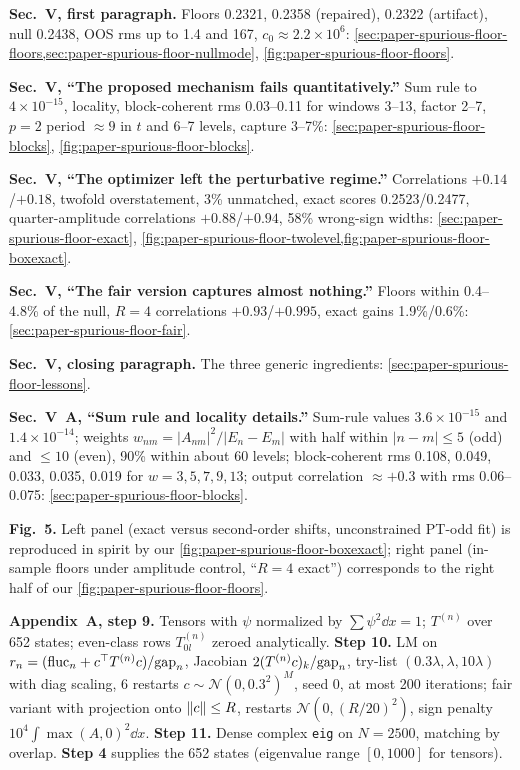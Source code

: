 \textbf{Sec.~V, first paragraph.} Floors 0.2321, 0.2358 (repaired), 0.2322 (artifact), null 0.2438, OOS rms up to 1.4 and 167, $c_0\approx2.2\times10^6$: \cref{sec:paper-spurious-floor-floors,sec:paper-spurious-floor-nullmode}, \cref{fig:paper-spurious-floor-floors}.

\textbf{Sec.~V, ``The proposed mechanism fails quantitatively.''} Sum rule to $4\times10^{-15}$, locality, block-coherent rms 0.03--0.11 for windows 3--13, factor 2--7, $p=2$ period $\approx9$ in $t$ and 6--7 levels, capture 3--7\%: \cref{sec:paper-spurious-floor-blocks}, \cref{fig:paper-spurious-floor-blocks}.

\textbf{Sec.~V, ``The optimizer left the perturbative regime.''} Correlations $+0.14$/$+0.18$, twofold overstatement, 3\% unmatched, exact scores 0.2523/0.2477, quarter-amplitude correlations $+0.88$/$+0.94$, 58\% wrong-sign widths: \cref{sec:paper-spurious-floor-exact}, \cref{fig:paper-spurious-floor-twolevel,fig:paper-spurious-floor-boxexact}.

\textbf{Sec.~V, ``The fair version captures almost nothing.''} Floors within 0.4--4.8\% of the null, $R=4$ correlations $+0.93$/$+0.995$, exact gains 1.9\%/0.6\%: \cref{sec:paper-spurious-floor-fair}.

\textbf{Sec.~V, closing paragraph.} The three generic ingredients: \cref{sec:paper-spurious-floor-lessons}.

\textbf{Sec.~V~A, ``Sum rule and locality details.''} Sum-rule values $3.6\times10^{-15}$ and $1.4\times10^{-14}$; weights $w_{nm}=|A_{nm}|^2/|E_n-E_m|$ with half within $|n-m|\le5$ (odd) and $\le10$ (even), 90\% within about 60 levels; block-coherent rms 0.108, 0.049, 0.033, 0.035, 0.019 for $w=3,5,7,9,13$; output correlation $\approx+0.3$ with rms 0.06--0.075: \cref{sec:paper-spurious-floor-blocks}.

\textbf{Fig.~5.} Left panel (exact versus second-order shifts, unconstrained PT-odd fit) is reproduced in spirit by our \cref{fig:paper-spurious-floor-boxexact}; right panel (in-sample floors under amplitude control, ``$R=4$ exact'') corresponds to the right half of our \cref{fig:paper-spurious-floor-floors}.

\textbf{Appendix~A, step 9.} Tensors with $\psi$ normalized by $\sum\psi^2\dd x=1$; $T^{(n)}$ over 652 states; even-class rows $T^{(n)}_{0l}$ zeroed analytically. \textbf{Step 10.} LM on $r_n=(\mathrm{fluc}_n+c^\top T^{(n)}c)/\mathrm{gap}_n$, Jacobian $2(T^{(n)}c)_k/\mathrm{gap}_n$, try-list $(0.3\lambda,\lambda,10\lambda)$ with diag scaling, 6 restarts $c\sim\mathcal N(0,0.3^2)^M$, seed 0, at most 200 iterations; fair variant with projection onto $\left\lVert c\right\rVert\le R$, restarts $\mathcal N(0,(R/20)^2)$, sign penalty $10^4\int\max(A,0)^2\dd x$. \textbf{Step 11.} Dense complex \texttt{eig} on $N=2500$, matching by overlap. \textbf{Step 4} supplies the 652 states (eigenvalue range $[0,1000]$ for tensors).

